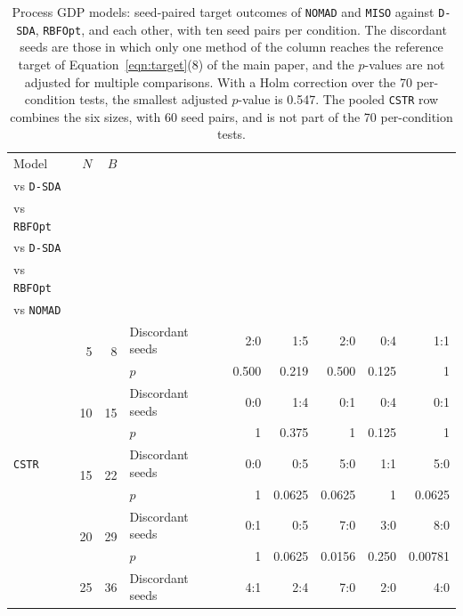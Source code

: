 \begin{table}[htbp]
\centering
\caption{Process GDP models: seed-paired target outcomes of \texttt{NOMAD} and \texttt{MISO} against \texttt{D-SDA}, \texttt{RBFOpt}, and each other, with ten seed pairs per condition.
The discordant seeds are those in which only one method of the column reaches the reference target of Equation~\ifdefined\manuscriptwithsupplement\eqref{eqn:target}\else(8)\fi{} of the main paper, and the \(p\)-values are not adjusted for multiple comparisons.
With a Holm correction over the 70 per-condition tests, the smallest adjusted \(p\)-value is 0.547.
The pooled \texttt{CSTR} row combines the six sizes, with 60 seed pairs, and is not part of the 70 per-condition tests.}
\label{tab:supp-nomad-miso-tests}
\footnotesize
\setlength{\tabcolsep}{3.5pt}
\begin{threeparttable}
\begin{tabular}{@{}lrrlrrrrr@{}}\toprule
Model & \(N\) & \(B\) & & \makecell{\texttt{NOMAD}\\vs \texttt{D-SDA}} & \makecell{\texttt{NOMAD}\\vs \texttt{RBFOpt}} & \makecell{\texttt{MISO}\\vs \texttt{D-SDA}} & \makecell{\texttt{MISO}\\vs \texttt{RBFOpt}} & \makecell{\texttt{MISO}\\vs \texttt{NOMAD}}\\\midrule
\multirow{12}{*}{\texttt{CSTR}} & \multirow{2}{*}{5} & \multirow{2}{*}{8} & Discordant seeds & 2:0 & 1:5 & 2:0 & 0:4 & 1:1 \\
 & & & \(p\) & 0.500 & 0.219 & 0.500 & 0.125 & 1 \\
\addlinespace[2pt]
 & \multirow{2}{*}{10} & \multirow{2}{*}{15} & Discordant seeds & 0:0 & 1:4 & 0:1 & 0:4 & 0:1 \\
 & & & \(p\) & 1 & 0.375 & 1 & 0.125 & 1 \\
\addlinespace[2pt]
 & \multirow{2}{*}{15} & \multirow{2}{*}{22} & Discordant seeds & 0:0 & 0:5 & 5:0 & 1:1 & 5:0 \\
 & & & \(p\) & 1 & 0.0625 & 0.0625 & 1 & 0.0625 \\
\addlinespace[2pt]
 & \multirow{2}{*}{20} & \multirow{2}{*}{29} & Discordant seeds & 0:1 & 0:5 & 7:0 & 3:0 & 8:0 \\
 & & & \(p\) & 1 & 0.0625 & 0.0156 & 0.250 & 0.00781 \\
\addlinespace[2pt]
 & \multirow{2}{*}{25} & \multirow{2}{*}{36} & Discordant seeds & 4:1 & 2:4 & 7:0 & 2:0 & 4:0 \\

\end{tabular}
\end{threeparttable}
\end{table}

